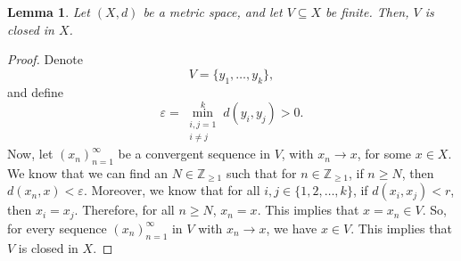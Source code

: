 \documentclass[a4paper, openany]{memoir}
\theoremstyle{definition}
\theoremstyle{plain}
\newtheorem{lemma}[definition]{Lemma}
\begin{document}
\begin{lemma}
Let $(X, d)$ be a metric space, and let $V \subseteq X$ be finite. Then, $V$ is closed in $X$.
\end{lemma}
\begin{proof}
Denote
\[V = \{y_1, \dots, y_k\},\]
and define
\[\varepsilon = \min_{\substack{i, j=1 \\ i \neq j}}^k d(y_i, y_j) > 0.\]
Now, let $(x_n)_{n=1}^{\infty}$ be a convergent sequence in $V$, with $x_n \to x$, for some $x \in X$. We know that we can find an $N \in \mathbb{Z}_{\geqslant 1}$ such that for $n \in \mathbb{Z}_{\geqslant 1}$, if $n \geqslant N$, then $d(x_n, x) < \varepsilon$. Moreover, we know that for all $i, j \in \{1, 2, \dots, k\}$, if $d(x_i, x_j) < r$, then $x_i = x_j$. Therefore, for all $n \geqslant N$, $x_n = x$. This implies that $x = x_n \in V$. So, for every sequence $(x_n)_{n=1}^{\infty}$ in $V$ with $x_n \to x$, we have $x \in V$. This implies that $V$ is closed in $X$.
\end{proof}
\end{document}
